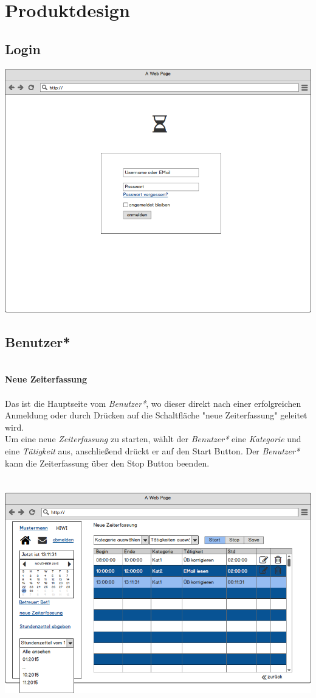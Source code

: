 \section{Produktdesign}

\subsection{Login}
\includegraphics[width=\linewidth]{UI/Login/Login.png}

\newpage
\subsection{Benutzer*}

\textbf{\\Neue Zeiterfassung}\\
\\
Das ist die Hauptseite vom \emph{Benutzer*}, wo dieser direkt nach einer erfolgreichen Anmeldung oder durch Drücken auf die Schaltfläche "neue Zeiterfassung" geleitet wird. \\
Um eine neue \emph{Zeiterfassung} zu starten, wählt der \emph{Benutzer*} eine \emph{Kategorie} und eine \emph{Tätigkeit} aus, anschließend drückt er auf den Start Button. Der \emph{Benutzer*} kann die Zeiterfassung über den Stop Button beenden.\\
\\
\\
\includegraphics[width=\linewidth]{UI/Benutzer/Zeiterfassung.png}


